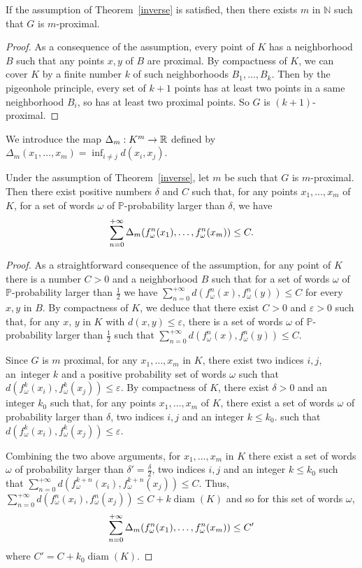 \documentclass[AHL,Unicode,longabstracts,published]{cedram}
\DeclareMathOperator{\diam}{diam}
\newcommand{\bbP}{\mathbb{P}}
\newcommand{\R}{\mathbb{R}}
\newcommand{\N}{\mathbb{N}}
\newcommand{\ep}{\varepsilon}
\renewcommand*{\to}{\mathchoice{\longrightarrow}{\rightarrow}{\rightarrow}{\rightarrow}}
\let\originalleft\left
\let\originalright\right
\renewcommand{\left}{\mathopen{}\mathclose\bgroup\originalleft}
\renewcommand{\right}{\aftergroup\egroup\originalright}
\newcommand{\R}{\mathbb{R}}
\begin{document}
\begin{lemm}
If the assumption of Theorem~\ref{inverse} is satisfied, then there exists $m$ in $\N$ such that $G$ is $m$-proximal.
\end{lemm}

\begin{proof}
As a consequence of the assumption, every point of $K$ has a neighborhood $B$ such that any points $x,y$ of $B$ are proximal. By compactness of $K$, we can cover $K$ by a finite number $k$ of such neighborhoods $B_1,\dots, B_k$. Then by the pigeonhole principle, every set of $k+1$ points has at least two points in a same neighborhood $B_i$, so has at least two proximal points. So $G$ is $(k+1)$-proximal.
\end{proof}

We introduce the map $\Delta_m:K^m\to\R$ defined by $\Delta_m(x_1,\dots,x_m)=\inf_{i\not= j}d(x_i,x_j)$.


\begin{lemm}\label{positiveprobacontraction}
Under the assumption of Theorem~\ref{inverse}, let $m$ be such that $G$ is $m$-proximal. Then there exist positive numbers $\delta$ and $C$ such that, for any points $x_1,\dots,x_m$ of $K$, for a set of words $\omega$ of $\bbP$-probability larger than $\delta$, we have
\[
\sum_{n=0}^{+\infty}\Delta_m\left(f_\omega^n(x_1),\dots,f_\omega^n(x_m)\right)\leq C.
\]
\end{lemm}
\begin{proof}
As a straightforward consequence of the assumption, for any point of $K$ there is a number $C>0$ and a neighborhood $B$ such that for a set of words $\omega$ of $\bbP$-probability larger than $\frac{1}{2}$ we have $\sum_{n=0}^{+\infty}d(f_\omega^n(x),f_\omega^n(y))\leq C$ for every $x,y$ in $B$. By compactness of $K$, we deduce that there exist $C>0$ and $\ep>0$ such that, for any $x$, $y$ in $K$ with $d(x,y)\leq \ep$, there is a set of words $\omega$ of $\bbP$-probability larger than $\frac{1}{2}$ such that $\sum_{n=0}^{+\infty}d(f_\omega^n(x),f_\omega^n(y))\leq C$.

Since $G$ is $m$ proximal, for any $x_1,\dots,x_m$ in $K$, there exist two indices $i, j$, an~integer $k$ and a positive probability set of words $\omega$ such that $d(f_\omega^k(x_i),f_\omega^k(x_j))\leq \ep$. By compactness of $K$, there exist $\delta>0$ and an integer $k_0$ such that, for any points $x_1,\dots,x_m$ of $K$, there exist a set of words $\omega$ of probability larger than $\delta$, two indices $i, j$ and an integer $k \leq k_0$. such that $d(f_\omega^k(x_i),f_\omega^k(x_j))\leq \ep$.


Combining the two above arguments, for $x_1,\dots,x_m$ in $K$ there exist a set of words $\omega$ of probability larger than $\delta'=\frac{\delta}{2}$, two indices $i, j$ and an integer $k \leq k_0$ such that\pagebreak{} $\sum_{n=0}^{+\infty}d(f_\omega^{k+n}(x_i),f_\omega^{k+n}(x_j))\leq C$. Thus, $ \sum_{n=0}^{+\infty}d(f_\omega^{n}(x_i),f_\omega^{n}(x_j))\leq C+ k \diam(K)$ and so for this set of words $\omega$,
\[
\sum_{n=0}^{+\infty}\Delta_m\left(f_\omega^n(x_1),\dots,f_\omega^n(x_m)\right)\leq C'
\]
where $C'=C+ k_0 \diam(K)$.
\end{proof}
\end{document}
